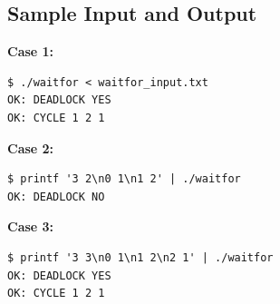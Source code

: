 \subsection{Sample Input and Output}


\textbf{Case 1:}
\begin{verbatim}
$ ./waitfor < waitfor_input.txt
OK: DEADLOCK YES
OK: CYCLE 1 2 1
\end{verbatim}

\textbf{Case 2:}
\begin{verbatim}
$ printf '3 2\n0 1\n1 2' | ./waitfor
OK: DEADLOCK NO
\end{verbatim}

\textbf{Case 3:}
\begin{verbatim}
$ printf '3 3\n0 1\n1 2\n2 1' | ./waitfor
OK: DEADLOCK YES
OK: CYCLE 1 2 1
\end{verbatim}